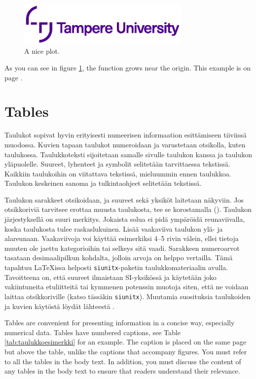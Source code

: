 \begin{figure}[h]
    \centering
    \includegraphics[width=0.75\textwidth]{figures/tau-logo-eng}
    \caption{A nice plot.}
    \label{fig:mesh1}
\end{figure}

As you can see in figure \ref{fig:mesh1}, the function grows near the origin. This example is on page \pageref{fig:mesh1}.


\section{Tables}

Taulukot sopivat hyvin erityisesti numeerisen informaation esittämiseen tiiviissä muodossa. Kuvien tapaan taulukot numeroidaan ja varustetaan otsikolla, kuten taulukossa. Taulukkoteksti sijoitetaan samalle sivulle taulukon kanssa ja taulukon yläpuolelle. Suureet, lyhenteet ja symbolit selitetään tarvittaessa tekstissä. Kaikkiin taulukoihin on viitattava tekstissä, mieluummin ennen taulukkoa. Taulukon keskeinen sanoma ja tulkintaohjeet selitetään tekstissä.

Taulukon sarakkeet otsikoidaan, ja suureet sekä yksiköt laitetaan näkyviin. Jos otsikkoriviä tarvitsee erottaa muusta taulukosta, tee se korostamalla (). Taulukon järjestyksellä on suuri merkitys. Jokaista solua ei pidä ympäröidä reunaviivalla, koska taulukosta tulee raskaslukuinen. Lisää vaakaviiva taulukon ylä- ja alareunaan. Vaakaviivoja voi käyttää esimerkiksi 4--5 rivin välein, ellei tietoja muuten ole jaettu kategorioihin tai selkeys sitä vaadi. Sarakkeen numeroarvot tasataan desimaalipilkun kohdalta, jolloin arvoja on helppo vertailla. Tämä tapahtuu \LaTeX{}issa helposti \texttt{siunitx}-paketin \parencite{siunitx} taulukkomateriaalin avulla. Tavoitteena on, että suureet ilmaistaan SI-yksikössä ja käytetään joko vakiintuneita etuliitteitä tai kymmenen potenssin muotoja siten, että ne voidaan laittaa otsikkoriville (katso tässäkin \texttt{siunitx}). Muutamia suosituksia taulukoiden ja kuvien käytöstä löydät lähteestä \parencite{pubadvice2009}.

Tables are convenient for presenting information in a concise way, especially numerical data. Tables have numbered captions, see Table \ref{tab:taulukkoesimerkki} for an example. The caption is placed on the same page but above the table, unlike the captions that accompany figures. You must refer to all the tables in the body text. In addition, you must discuss the content of any tables in the body text to ensure that readers understand their relevance.

